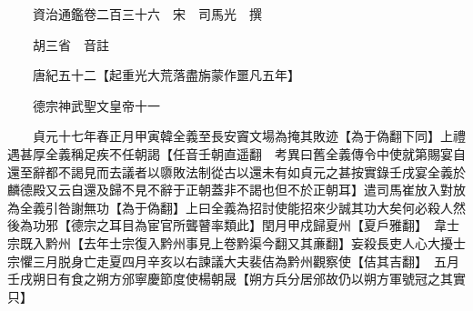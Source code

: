 










 


 
 


 

  
  
  
  
  





  
  
  
  
  
 
  

  

  
  
  



  

 
 

  
   




  

  
  


  　　資治通鑑卷二百三十六　宋　司馬光　撰

　　胡三省　音註

　　唐紀五十二【起重光大荒落盡旃蒙作噩凡五年】

　　德宗神武聖文皇帝十一

　　貞元十七年春正月甲寅韓全義至長安竇文場為掩其敗迹【為于偽翻下同】上禮遇甚厚全義稱足疾不任朝謁【任音壬朝直遥翻　考異曰舊全義傳令中使就第賜宴自還至辭都不謁見而去議者以隳敗法制從古以還未有如貞元之甚按實錄壬戌宴全義於麟德殿又云自還及歸不見不辭于正朝蓋非不謁也但不於正朝耳】遣司馬崔放入對放為全義引咎謝無功【為于偽翻】上曰全義為招討使能招來少誠其功大矣何必殺人然後為功邪【德宗之耳目為宦官所聾瞽率類此】閏月甲戍歸夏州【夏戶雅翻】　韋士宗既入黔州【去年士宗復入黔州事見上卷黔渠今翻又其亷翻】妄殺長吏人心大擾士宗懼三月脱身亡走夏四月辛亥以右諫議大夫裴佶為黔州觀察使【佶其吉翻】　五月壬戌朔日有食之朔方邠寧慶節度使楊朝晟【朔方兵分居邠故仍以朔方軍號冠之其實只】

